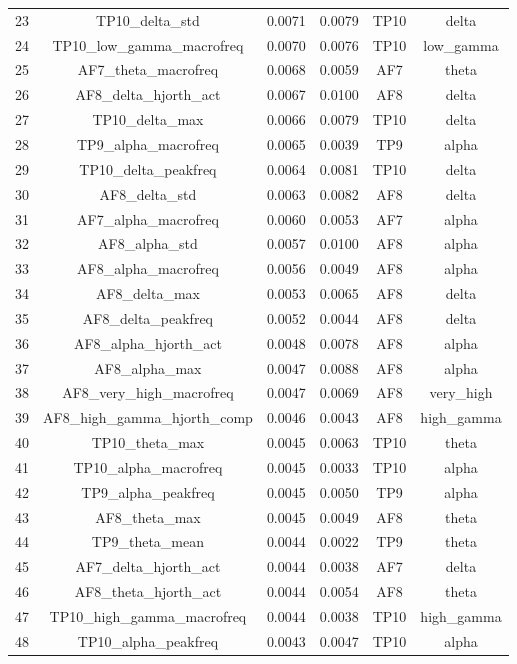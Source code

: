 \begin{table}[hptb]
\begin{table}
\begin{tabular}{cccccc}
23 & TP10_delta_std & 0.0071 & 0.0079 & TP10 & delta \\
24 & TP10_low_gamma_macrofreq & 0.0070 & 0.0076 & TP10 & low_gamma \\
25 & AF7_theta_macrofreq & 0.0068 & 0.0059 & AF7 & theta \\
26 & AF8_delta_hjorth_act & 0.0067 & 0.0100 & AF8 & delta \\
27 & TP10_delta_max & 0.0066 & 0.0079 & TP10 & delta \\
28 & TP9_alpha_macrofreq & 0.0065 & 0.0039 & TP9 & alpha \\
29 & TP10_delta_peakfreq & 0.0064 & 0.0081 & TP10 & delta \\
30 & AF8_delta_std & 0.0063 & 0.0082 & AF8 & delta \\
31 & AF7_alpha_macrofreq & 0.0060 & 0.0053 & AF7 & alpha \\
32 & AF8_alpha_std & 0.0057 & 0.0100 & AF8 & alpha \\
33 & AF8_alpha_macrofreq & 0.0056 & 0.0049 & AF8 & alpha \\
34 & AF8_delta_max & 0.0053 & 0.0065 & AF8 & delta \\
35 & AF8_delta_peakfreq & 0.0052 & 0.0044 & AF8 & delta \\
36 & AF8_alpha_hjorth_act & 0.0048 & 0.0078 & AF8 & alpha \\
37 & AF8_alpha_max & 0.0047 & 0.0088 & AF8 & alpha \\
38 & AF8_very_high_macrofreq & 0.0047 & 0.0069 & AF8 & very_high \\
39 & AF8_high_gamma_hjorth_comp & 0.0046 & 0.0043 & AF8 & high_gamma \\
40 & TP10_theta_max & 0.0045 & 0.0063 & TP10 & theta \\
41 & TP10_alpha_macrofreq & 0.0045 & 0.0033 & TP10 & alpha \\
42 & TP9_alpha_peakfreq & 0.0045 & 0.0050 & TP9 & alpha \\
43 & AF8_theta_max & 0.0045 & 0.0049 & AF8 & theta \\
44 & TP9_theta_mean & 0.0044 & 0.0022 & TP9 & theta \\
45 & AF7_delta_hjorth_act & 0.0044 & 0.0038 & AF7 & delta \\
46 & AF8_theta_hjorth_act & 0.0044 & 0.0054 & AF8 & theta \\
47 & TP10_high_gamma_macrofreq & 0.0044 & 0.0038 & TP10 & high_gamma \\
48 & TP10_alpha_peakfreq & 0.0043 & 0.0047 & TP10 & alpha \\

\end{tabular}
\end{table}
\end{table}
